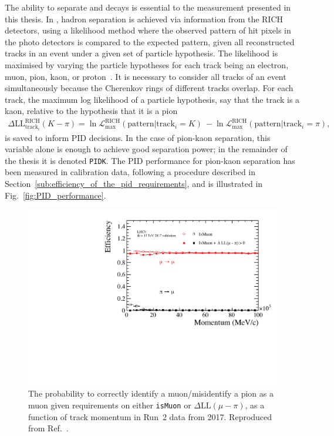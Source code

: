 The ability to separate \BtoDK and \BtoDpi decays is essential to the measurement presented in this thesis. In \lhcb, hadron separation is achieved via information from the RICH detectors, using a likelihood method where the observed pattern of hit pixels in the photo detectors is compared to the expected pattern, given all reconstructed tracks in an event under a given set of particle hypothesis. The likelihood is maximised by varying the particle hypotheses for each track being an electron, muon, pion, kaon, or proton~\cite{Forty:684714}.  It is necessary to consider all tracks of an event simultaneously because the Cherenkov rings of different tracks overlap. For each track, the maximum log likelihood of a particle hypothesis, say that the track is a kaon, relative to the hypothesis that it is a pion
\begin{align}\label{eq:DLL}
    \Delta\text{LL}_{\text{track}_i}^\text{RICH}(K-\pi) =  \ln \mathcal L_\text{max}^\text{RICH}(\text{pattern}|\text{track}_i = K)\ - \ln \mathcal L_\text{max}^\text{RICH}(\text{pattern}|\text{track}_i = \pi),
\end{align}
is saved to inform PID decisions. In the case of pion-kaon separation, this variable alone is enough to achieve good separation power; in the remainder of the thesis it is denoted \texttt{PIDK}. The PID performance for pion-kaon separation has been measured in calibration data, following a procedure described in Section~\ref{sub:efficiency_of_the_pid_requirements}, and is illustrated in Fig.~\ref{fig:PID_performance}.

\begin{figure}[tb]
    \centering
    \includegraphics[width=0.60\columnwidth]{figures/detector/PIDmu_Run2.pdf}
    \caption{The probability to correctly identify a muon/misidentify a pion as a muon given requirements on either \texttt{isMuon} or $\Delta \mathrm{LL}(\mu-\pi)$, as a function of track momentum in Run~2 data from 2017. Reproduced from Ref.~\cite{PIDplots}.}
    \label{fig:PIDmu_performance}
\end{figure}

